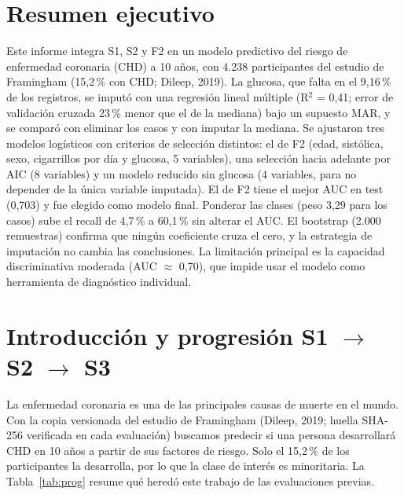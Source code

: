 \documentclass[11pt,a4paper]{article}
\begin{document}
\section*{Resumen ejecutivo}
Este informe integra S1, S2 y F2 en un modelo predictivo del riesgo de enfermedad coronaria (CHD) a 10 años, con 4.238 participantes del estudio de Framingham (15,2\,\% con CHD; Dileep, 2019). La glucosa, que falta en el 9,16\,\% de los registros, se imputó con una regresión lineal múltiple (R$^2$ = 0,41; error de validación cruzada 23\,\% menor que el de la mediana) bajo un supuesto MAR, y se comparó con eliminar los casos y con imputar la mediana. Se ajustaron tres modelos logísticos con criterios de selección distintos: el de F2 (edad, sistólica, sexo, cigarrillos por día y glucosa, 5 variables), una selección hacia adelante por AIC (8 variables) y un modelo reducido sin glucosa (4 variables, para no depender de la única variable imputada). El de F2 tiene el mejor AUC en test (0,703) y fue elegido como modelo final. Ponderar las clases (peso 3,29 para los casos) sube el recall de 4,7\,\% a 60,1\,\% sin alterar el AUC. El bootstrap (2.000 remuestras) confirma que ningún coeficiente cruza el cero, y la estrategia de imputación no cambia las conclusiones. La limitación principal es la capacidad discriminativa moderada (AUC $\approx$ 0,70), que impide usar el modelo como herramienta de diagnóstico individual.

\section{Introducción y progresión S1 $\to$ S2 $\to$ S3}
La enfermedad coronaria es una de las principales causas de muerte en el mundo. Con la copia versionada del estudio de Framingham (Dileep, 2019; huella SHA-256 verificada en cada evaluación) buscamos predecir si una persona desarrollará CHD en 10 años a partir de sus factores de riesgo. Solo el 15,2\,\% de los participantes la desarrolla, por lo que la clase de interés es minoritaria. La Tabla~\ref{tab:prog} resume qué heredó este trabajo de las evaluaciones previas.
\end{document}
